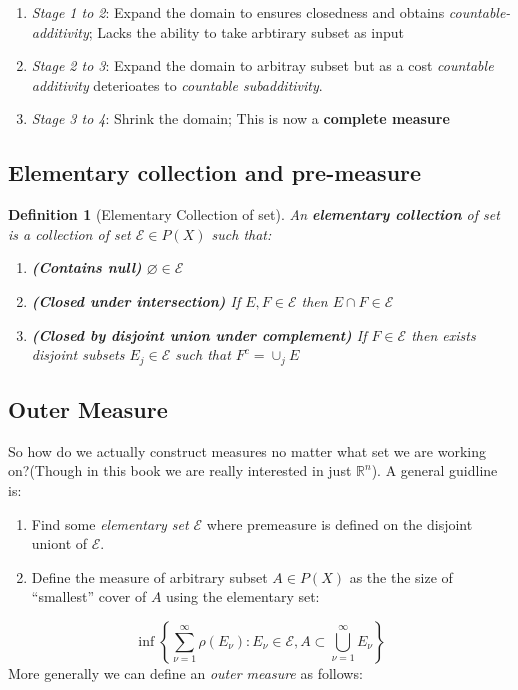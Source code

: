 \documentclass[a4paper,11pt,oneside]{book}
\newtheorem{definition}{Definition}[section]
\begin{document}
\begin{enumerate}
\item \textit{Stage 1 to 2}: Expand the domain to ensures closedness and obtains \textit{countable-additivity}; Lacks the ability to take arbtirary subset as input
\item \textit{Stage 2 to 3}: Expand the domain to arbitray subset but as a cost \textit{countable additivity} deterioates to \textit{countable subadditivity}.
\item \textit{Stage 3 to 4}: Shrink the domain; This is now a \textbf{complete measure}
\end{enumerate}

\subsection{Elementary collection and pre-measure}

\begin{definition}[Elementary Collection of set]An \textbf{elementary collection} of set is a collection of set $\mathcal E \in P(X)$ such that:

\begin{enumerate}
\item \textbf{(Contains null)} $\varnothing \in \mathcal E$
\item \textbf{(Closed under intersection)} If $E,F\in \mathcal E$ then $E\cap F\in \mathcal E$
\item \textbf{(Closed by disjoint union under complement)} If $F\in \mathcal E$ then exists disjoint subsets $E_j\in \mathcal E$ such that $F^c = \cup_j E$
\end{enumerate}

\end{definition}\subsection{Outer Measure}

So how do we actually construct measures no matter what set we are working on?(Though in this book we are really interested in just $\mathbb{R}^n$). A general guidline is:

\begin{enumerate}
\item Find some \textit{elementary set} $\mathcal{E}$ where premeasure is defined on the disjoint uniont of $\mathcal{E}$.
\item Define the measure of arbitrary subset $A\in P(X)$ as the the size of ``smallest'' cover of $A$ using the elementary set:
\end{enumerate}
\begin{equation}
\label{omfml}
\inf \left\{\sum_{\nu=1}^{\infty} \rho(E_{\nu}): E_{\nu}\in \mathcal{E}, A\subset \bigcup_{\nu=1}^{\infty} E_{\nu}\right\}
\end{equation}
More generally we can define an \textit{outer measure} as follows:
\end{document}
